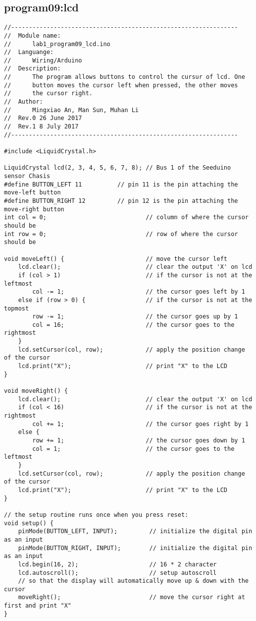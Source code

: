 \subsection{program09:lcd}
\begin{verbatim}
//----------------------------------------------------------------
//  Module name:
//      lab1_program09_lcd.ino
//  Languange:
//      Wiring/Arduino
//  Description:
//      The program allows buttons to control the cursur of lcd. One
//      button moves the cursor left when pressed, the other moves
//      the cursor right. 
//  Author:
//      Mingxiao An, Man Sun, Muhan Li
//  Rev.0 26 June 2017
//  Rev.1 8 July 2017
//----------------------------------------------------------------

#include <LiquidCrystal.h>

LiquidCrystal lcd(2, 3, 4, 5, 6, 7, 8); // Bus 1 of the Seeduino sensor Chasis
#define BUTTON_LEFT 11          // pin 11 is the pin attaching the move-left button
#define BUTTON_RIGHT 12         // pin 12 is the pin attaching the move-right button
int col = 0;                            // column of where the cursor should be
int row = 0;                            // row of where the cursor should be

void moveLeft() {                       // move the cursor left
    lcd.clear();                        // clear the output 'X' on lcd
    if (col > 1)                        // if the cursor is not at the leftmost
        col -= 1;                       // the cursor goes left by 1
    else if (row > 0) {                 // if the cursor is not at the topmost
        row -= 1;                       // the cursor goes up by 1 
        col = 16;                       // the cursor goes to the rightmost
    }
    lcd.setCursor(col, row);            // apply the position change of the cursor
    lcd.print("X");                     // print "X" to the LCD
}

void moveRight() {
    lcd.clear();                        // clear the output 'X' on lcd
    if (col < 16)                       // if the cursor is not at the rightmost
        col += 1;                       // the cursor goes right by 1
    else {
        row += 1;                       // the cursor goes down by 1 
        col = 1;                        // the cursor goes to the leftmost
    }
    lcd.setCursor(col, row);            // apply the position change of the cursor
    lcd.print("X");                     // print "X" to the LCD
}

// the setup routine runs once when you press reset:
void setup() {
    pinMode(BUTTON_LEFT, INPUT);         // initialize the digital pin as an input
    pinMode(BUTTON_RIGHT, INPUT);        // initialize the digital pin as an input
    lcd.begin(16, 2);                    // 16 * 2 character
    lcd.autoscroll();                    // setup autoscroll 
    // so that the display will automatically move up & down with the cursor
    moveRight();                         // move the cursor right at first and print "X"
}


\end{verbatim}
